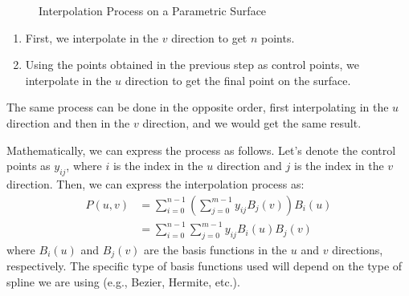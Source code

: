 \begin{figure}
    \caption{Interpolation Process on a Parametric Surface}
    \label{fig:parametric_surface_interpolation}
\end{figure}
\begin{enumerate}
    \item First, we interpolate in the $v$ direction to get $n$ points.
    \item Using the points obtained in the previous step as control points, we interpolate in the $u$ direction to get the final point on the surface.
\end{enumerate}
\begin{observacion}
    The same process can be done in the opposite order, first interpolating in the $u$ direction and then in the $v$ direction, and we would get the same result.
\end{observacion}

Mathematically, we can express the process as follows. Let's denote the control points as $y_{ij}$, where $i$ is the index in the $u$ direction and $j$ is the index in the $v$ direction. Then, we can express the interpolation process as:
\begin{align*}
    P(u,v) &= \sum_{i=0}^{n-1} \left( \sum_{j=0}^{m-1} y_{ij} B_j(v) \right) B_i(u)\\
    &= \sum_{i=0}^{n-1} \sum_{j=0}^{m-1} y_{ij} B_i(u) B_j(v)
\end{align*}
where $B_i(u)$ and $B_j(v)$ are the basis functions in the $u$ and $v$ directions, respectively. The specific type of basis functions used will depend on the type of spline we are using (e.g., Bezier, Hermite, etc.).